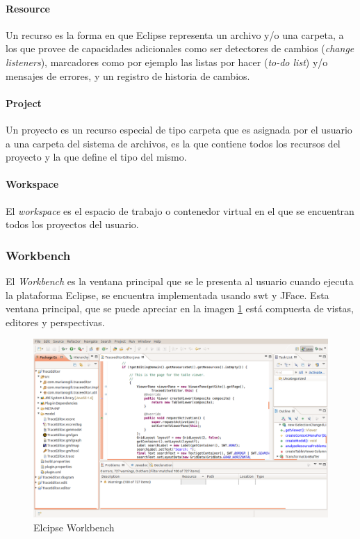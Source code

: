 \documentclass[a4paper,12pt,oneside,spanish]{book}
\begin{document}
\paragraph{Resource} Un recurso es la forma en que \textsf{Eclipse} representa un archivo y/o una carpeta, a los que provee de capacidades adicionales como ser detectores de cambios (\textit{change listeners}), marcadores como por ejemplo las listas por hacer (\textit{to-do list}) y/o mensajes de errores, y un registro de historia de cambios.

\paragraph{Project} Un proyecto es un recurso especial de tipo carpeta que es asignada por el usuario a una carpeta del sistema de archivos, es la que contiene todos los recursos del proyecto y la que define el tipo del mismo.

\paragraph{Workspace} El \textit{workspace} es el espacio de trabajo o contenedor virtual en el que se encuentran todos los proyectos del usuario.


\subsubsection{Workbench}

El \textit{Workbench} es la ventana principal que se le presenta al usuario cuando ejecuta la plataforma \textsf{Eclipse}, se encuentra implementada usando \gls{swt} y JFace. Esta ventana principal, que se puede apreciar en la imagen \ref{fig:EclipseWorkbench} está compuesta de vistas, editores y perspectivas.

\begin{figure}[hbtp]
\centering
\includegraphics[scale=0.31]{./img/EclipseWorkbench}
\caption{Elcipse Workbench}
\label{fig:EclipseWorkbench}
\end{figure}
\end{document}
